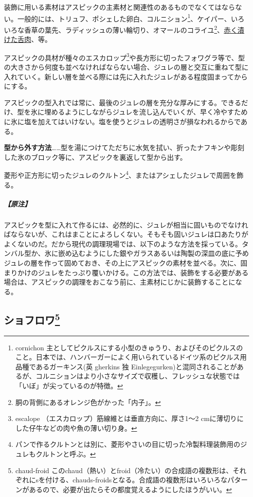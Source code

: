 装飾に用いる素材はアスピックの主素材と関連性のあるものでなくてはならない。一般的には、トリュフ、ポシェした卵白、コルニション\footnote{cornichon
  主としてピクルスにする小型のきゅうり、およびそのピクルスのこと。日本では、ハンバーガーによく用いられているドイツ系のピクルス用品種であるガーキンス(英
  gherkins 独
  Einlegegurken)と混同されることがあるが、コルニションはより小さなサイズで収穫し、フレッシュな状態では「いぼ」が尖っているのが特徴。}、ケイパー、いろいろな香草の葉先、ラディッシュの薄い輪切り、オマールのコライユ\footnote{胴の背側にあるオレンジ色がかった「内子」。}、\protect\hyperlink{saumure-liquide-pour-langues}{赤く漬けた舌肉}、等。

アスピックの具材が種々のエスカロップ\footnote{escalope
  （エスカロップ）筋線維とは垂直方向に、厚さ1〜2
  cmに薄切りにした仔牛などの肉や魚の薄い切り身。}や長方形に切ったフォワグラ等で、型の大きさから何度も並べなければならない場合、ジュレの層と交互に重ねて型に入れていく。新しい層を並べる際には先に入れたジュレがある程度固まってからにする。

アスピックの型入れでは常に、最後のジュレの層を充分な厚みにする。できるだけ、型を氷に埋めるようにしながらジュレを流し込んでいくが、早く冷やすために氷に塩を加えてはいけない。塩を使うとジュレの透明さが損なわれるからである。

\noindent\textbf{型から外す方法}\ldots{}\ldots{}型を湯につけてただちに水気を拭い、折ったナフキンや彫刻した氷のブロック等に、アスピックを裏返して型から出す。

菱形や正方形に切ったジュレのクルトン\footnote{パンで作るクルトンとは別に、菱形やさいの目に切った冷製料理装飾用のジュレもクルトンと呼ぶ。}、またはアシェしたジュレで周囲を飾る。

\hypertarget{nota-aspics}{%
\subparagraph{【原注】}\label{nota-aspics}}

アスピックを型に入れて作るには、必然的に、ジュレが相当に固いものでなければならないが、これはまことによろしくない。そもそも固いジュレは口あたりがよくないのだ。だから現代の調理現場では、以下のような方法を採っている。タンバル型か、氷に嵌め込むようにした銀やガラスあるいは陶製の深皿の底に予めジュレの層を作って固めておき、その上にアスピックの素材を並べる。次に、固まりかけのジュレをたっぷり覆いかける。この方法では、装飾をする必要がある場合は、アスピックの調理をおこなう前に、主素材にじかに装飾することになる。

\hypertarget{chauds-froids}{%
\subsection[ショフロワ]{\texorpdfstring{ショフロワ\footnote{chaud-froid
  このchaud（熱い）とfroid（冷たい）の合成語の複数形は、それぞれにsを付ける、chauds-froidsとなる。合成語の複数形はいろいろなパターンがあるので、必要が出たらその都度覚えるようにしたほうがいい。}}{ショフロワ}}\label{chauds-froids}}

